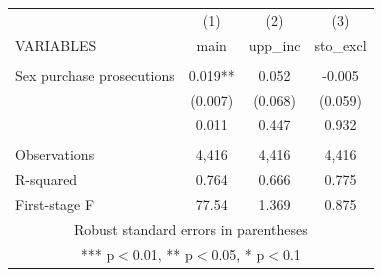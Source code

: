 \begin{tabular}{lccc} \hline
 & (1) & (2) & (3) \\
VARIABLES & main & upp\_inc & sto\_excl \\ \hline
 &  &  &  \\
Sex purchase prosecutions & 0.019** & 0.052 & -0.005 \\
 & (0.007) & (0.068) & (0.059) \\
 & 0.011 & 0.447 & 0.932 \\
 &  &  &  \\
Observations & 4,416 & 4,416 & 4,416 \\
R-squared & 0.764 & 0.666 & 0.775 \\
 First-stage F & 77.54 & 1.369 & 0.875 \\ \hline
\multicolumn{4}{c}{ Robust standard errors in parentheses} \\
\multicolumn{4}{c}{ *** p$<$0.01, ** p$<$0.05, * p$<$0.1} \\
\end{tabular}
